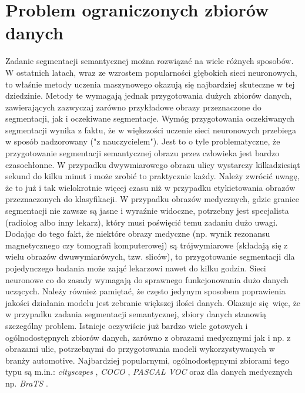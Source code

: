 \documentclass{classrep}
\begin{document}
    \section{Problem ograniczonych zbiorów danych} {

        Zadanie segmentacji semantycznej można rozwiązać na wiele różnych sposobów. W ostatnich latach, wraz
        ze wzrostem popularności głębokich sieci neuronowych, to właśnie metody uczenia maszynowego okazują
        się najbardziej skuteczne w tej dziedzinie. Metody te wymagają jednak przygotowania dużych zbiorów
        danych, zawierających zazwyczaj zarówno przykładowe obrazy przeznaczone do segmentacji, jak i
        oczekiwane segmentacje. Wymóg przygotowania oczekiwanych segmentacji wynika z faktu, że w większości
        uczenie sieci neuronowych przebiega w sposób nadzorowany ("z nauczycielem"). Jest to o tyle
        problematyczne, że przygotowanie segmentacji semantycznej obrazu przez człowieka jest bardzo
        czasochłonne. W przypadku dwywmiarowego obrazu ulicy wystarczy kilkadziesiąt sekund do kilku minut i
        może zrobić to praktycznie każdy. Należy zwrócić uwagę, że to już i tak wielokrotnie więcej czasu
        niż w przypadku etykietowania obrazów przeznaczonych do klasyfikacji. W przypadku obrazów
        medycznych, gdzie granice segmentacji nie zawsze są jasne i wyraźnie widoczne, potrzebny jest
        specjalista (radiolog albo inny lekarz), który musi poświęcić temu zadaniu dużo uwagi. Dodając do
        tego fakt, że niektóre obrazy medyczne (np. wynik rezonansu magnetycznego czy tomografi
        komputerowej) są trójwymiarowe (składają się z wielu obrazów dwuwymiarówych, tzw. sliców), to
        przygotowanie segmentacji dla pojedynczego badania może zająć lekarzowi nawet do kilku godzin. Sieci
        neuronowe co do zasady wymagają do sprawnego funkcjonowania dużo danych uczących. Należy również
        pamiętać, że często jedynym sposobem poprawienia jakości działania modelu jest zebranie większej
        ilości danych. Okazuje się więc, że w przypadku zadania segmentacji semantycznej, zbiory danych
        stanowią szczególny problem. Istnieje oczywiście już bardzo wiele gotowych i ogólnodostępnych
        zbiorów danych, zarówno z obrazami medycznymi jak i np. z obrazami ulic, potrzebnymi do
        przygotowania modeli wykorzystywanych w branży automotive. Najbardziej popularnymi, ogólnodostępnymi
        zbiorami tego typu są m.in.: \emph{cityscapes} \cite{url:cityscapes}, \emph{COCO} \cite{url:coco},
        \emph{PASCAL VOC} \cite{url:pascal_voc} oraz dla danych medycznych np. \emph{BraTS} \cite{url:brats}.

}
\end{document}

